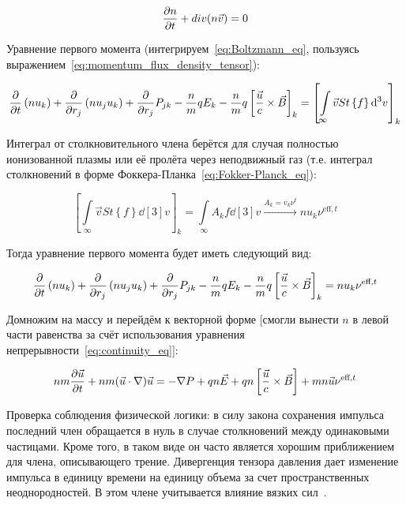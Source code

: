 \documentclass[10pt, a4paper]{article}
\begin{document}
\begin{equation} \label{eq:continuity_eq}
	\pdv{n}{t}+div{\left(n \vec{v} \right)} = 0
\end{equation}

Уравнение первого момента (интегрируем~\eqref{eq:Boltzmann_eq}, пользуясь выражением~\eqref{eq:momentum_flux_density_tensor}):

\begin{equation*}
	\pdv{}{t}\left(nu_k\right) +\pdv{}{r_j}\left( nu_ju_k\right) +\pdv{r_j}P_{jk}-\frac{n}{m}qE_k-\frac{n}{m}q\left[\frac{\vec{u}}{c}\times\vec{B}\right]_k=\left[\int\limits_\infty \vec{v} St\left\lbrace f\right\rbrace\dd[3]{v}\right]_k
\end{equation*}

Интеграл от столкновительного члена берётся для случая полностью ионизованной плазмы или её пролёта через неподвижный газ (т.е. интеграл столкновений в форме Фоккера-Планка~\eqref{eq:Fokker-Planck_eq}):

\begin{equation*}
	\left[\int\limits_\infty \vec{v} St\left\lbrace f\right\rbrace \dd[3]{v} \right]_k = \int\limits_\infty A_kf\dd[3]{v}\xrightarrow{A_k = v_k\nu^t}nu_k\nu^{\text{eff}, t}
\end{equation*}

Тогда уравнение первого момента будет иметь следующий вид:

\begin{equation*}
	\pdv{}{t}\left(nu_k\right) +\pdv{}{r_j}\left( nu_ju_k\right) +\pdv{r_j}P_{jk}-\frac{n}{m}qE_k-\frac{n}{m}q\left[\frac{\vec{u}}{c}\times\vec{B}\right]_k=nu_k\nu^{\text{eff}, t}
\end{equation*}

Домножим на массу и перейдём к векторной форме [смогли вынести $n$ в левой части равенства за счёт использования уравнения непрерывности~\eqref{eq:continuity_eq}]:

\begin{equation*}
	nm\pdv{\vec{u}}{t}+nm(\vec{u}\cdot\nabla)\vec{u}= -\nabla P +qn\vec{E}+qn\left[\frac{\vec{u}}{c}\times\vec{B}\right]+mn\vec{u}\nu^{\text{eff}, t}
\end{equation*}

Проверка соблюдения физической логики: в силу закона сохранения импульса последний член обращается в нуль в случае столкновений между одинаковыми частицами. Кроме того, в таком виде он часто является хорошим приближением
для члена, описывающего трение. Дивергенция тензора давления
дает изменение импульса в единицу времени на единицу объема за счет пространственных неоднородностей. В этом члене учитывается влияние вязких сил~\cite{kroll}. 
\end{document}
